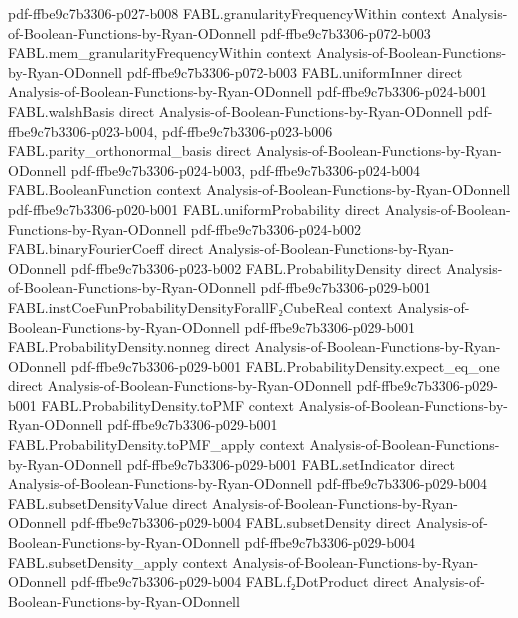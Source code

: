 \begin{theorem}
  {pdf-ffbe9c7b3306-p027-b008}
\proofstep
  {FABL.granularityFrequencyWithin}
  {context}
  {Analysis-of-Boolean-Functions-by-Ryan-ODonnell}
  {pdf-ffbe9c7b3306-p072-b003}
\proofstep
  {FABL.mem_granularityFrequencyWithin}
  {context}
  {Analysis-of-Boolean-Functions-by-Ryan-ODonnell}
  {pdf-ffbe9c7b3306-p072-b003}
\proofstep
  {FABL.uniformInner}
  {direct}
  {Analysis-of-Boolean-Functions-by-Ryan-ODonnell}
  {pdf-ffbe9c7b3306-p024-b001}
\proofstep
  {FABL.walshBasis}
  {direct}
  {Analysis-of-Boolean-Functions-by-Ryan-ODonnell}
  {pdf-ffbe9c7b3306-p023-b004,
    pdf-ffbe9c7b3306-p023-b006}
\proofstep
  {FABL.parity_orthonormal_basis}
  {direct}
  {Analysis-of-Boolean-Functions-by-Ryan-ODonnell}
  {pdf-ffbe9c7b3306-p024-b003,
    pdf-ffbe9c7b3306-p024-b004}
\proofstep
  {FABL.BooleanFunction}
  {context}
  {Analysis-of-Boolean-Functions-by-Ryan-ODonnell}
  {pdf-ffbe9c7b3306-p020-b001}
\proofstep
  {FABL.uniformProbability}
  {direct}
  {Analysis-of-Boolean-Functions-by-Ryan-ODonnell}
  {pdf-ffbe9c7b3306-p024-b002}
\proofstep
  {FABL.binaryFourierCoeff}
  {direct}
  {Analysis-of-Boolean-Functions-by-Ryan-ODonnell}
  {pdf-ffbe9c7b3306-p023-b002}
\proofstep
  {FABL.ProbabilityDensity}
  {direct}
  {Analysis-of-Boolean-Functions-by-Ryan-ODonnell}
  {pdf-ffbe9c7b3306-p029-b001}
\proofstep
  {FABL.instCoeFunProbabilityDensityForallF₂CubeReal}
  {context}
  {Analysis-of-Boolean-Functions-by-Ryan-ODonnell}
  {pdf-ffbe9c7b3306-p029-b001}
\proofstep
  {FABL.ProbabilityDensity.nonneg}
  {direct}
  {Analysis-of-Boolean-Functions-by-Ryan-ODonnell}
  {pdf-ffbe9c7b3306-p029-b001}
\proofstep
  {FABL.ProbabilityDensity.expect_eq_one}
  {direct}
  {Analysis-of-Boolean-Functions-by-Ryan-ODonnell}
  {pdf-ffbe9c7b3306-p029-b001}
\proofstep
  {FABL.ProbabilityDensity.toPMF}
  {context}
  {Analysis-of-Boolean-Functions-by-Ryan-ODonnell}
  {pdf-ffbe9c7b3306-p029-b001}
\proofstep
  {FABL.ProbabilityDensity.toPMF_apply}
  {context}
  {Analysis-of-Boolean-Functions-by-Ryan-ODonnell}
  {pdf-ffbe9c7b3306-p029-b001}
\proofstep
  {FABL.setIndicator}
  {direct}
  {Analysis-of-Boolean-Functions-by-Ryan-ODonnell}
  {pdf-ffbe9c7b3306-p029-b004}
\proofstep
  {FABL.subsetDensityValue}
  {direct}
  {Analysis-of-Boolean-Functions-by-Ryan-ODonnell}
  {pdf-ffbe9c7b3306-p029-b004}
\proofstep
  {FABL.subsetDensity}
  {direct}
  {Analysis-of-Boolean-Functions-by-Ryan-ODonnell}
  {pdf-ffbe9c7b3306-p029-b004}
\proofstep
  {FABL.subsetDensity_apply}
  {context}
  {Analysis-of-Boolean-Functions-by-Ryan-ODonnell}
  {pdf-ffbe9c7b3306-p029-b004}
\proofstep
  {FABL.f₂DotProduct}
  {direct}
  {Analysis-of-Boolean-Functions-by-Ryan-ODonnell}

\end{theorem}
